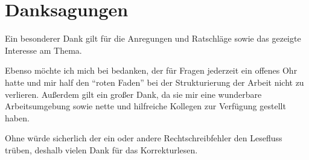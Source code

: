 \chapter*{Danksagungen}

Ein besonderer Dank gilt \thesisAdvisor{} für die Anregungen und Ratschläge sowie das gezeigte Interesse am Thema.

Ebenso möchte ich mich bei \thesisAdvisorSprd{} bedanken, der für Fragen jederzeit ein offenes Ohr hatte und mir half den \enquote{roten Faden} bei der Strukturierung der Arbeit nicht zu verlieren. Außerdem gilt \thesisCompany{} ein großer Dank, da sie mir eine wunderbare Arbeitsumgebung sowie nette und hilfreiche Kollegen zur Verfügung gestellt haben.

Ohne \thesisProofreader{} würde sicherlich der ein oder andere Rechtschreibfehler den Lesefluss trüben, deshalb vielen Dank für das Korrekturlesen.